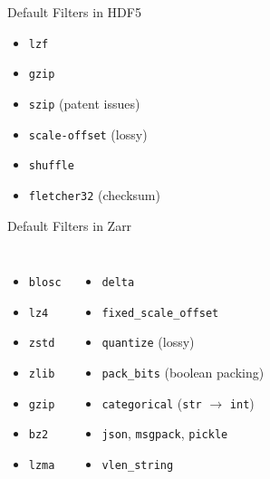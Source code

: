 \documentclass{beamer}
\begin{document}
\begin{frame}{Default Filters in HDF5}
  \begin{itemize}
  \item \texttt{lzf}
  \item \texttt{gzip}
  \item \texttt{szip} (patent issues)
  \item \texttt{scale-offset} (lossy)
  \item \texttt{shuffle}
  \item \texttt{fletcher32} (checksum)
  \end{itemize}
\end{frame}

\begin{frame}{Default Filters in Zarr}
  \begin{columns}
    \begin{itemize}
    \item \texttt{blosc}
    \item \texttt{lz4}
    \item \texttt{zstd}
    \item \texttt{zlib}
    \item \texttt{gzip}
    \item \texttt{bz2}
    \item \texttt{lzma}
    \end{itemize}

    \begin{itemize}
    \item \texttt{delta}
    \item \texttt{fixed\_scale\_offset}
    \item \texttt{quantize} (lossy)
    \item \texttt{pack\_bits} (boolean packing)
    \item \texttt{categorical} (\texttt{str} $\rightarrow$ \texttt{int})
    \item \texttt{json}, \texttt{msgpack}, \texttt{pickle}
    \item \texttt{vlen\_string}
    \end{itemize}
  \end{columns}
\end{frame}
\end{document}
